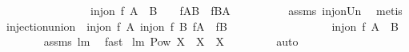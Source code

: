 \begin{isabellebody}
\ \ \ \ \ \ \ \ \ \ \ \ \ \ \ \ {\isachardoublequoteopen}inj{\isacharunderscore}on\ f\ {\isacharparenleft}A\ {\isasymunion}\ B{\isacharparenright}\ \ {\isacharequal}\ \ {\isacharparenleft}f{\isacharbackquote}{\isacharparenleft}A{\isacharminus}B{\isacharparenright}\ {\isasyminter}\ {\isacharparenleft}f{\isacharbackquote}{\isacharparenleft}B{\isacharminus}A{\isacharparenright}{\isacharparenright}\ {\isacharequal}\ {\isacharbraceleft}{\isacharbraceright}{\isacharparenright}{\isachardoublequoteclose}\isanewline
%
\isadelimproof
\ \ \ \ \ \ %
\endisadelimproof
%
\isatagproof
{}\isamarkupfalse%
\ assms\ inj{\isacharunderscore}on{\isacharunderscore}Un\ \isamarkupfalse%
\ {\isacharparenleft}metis{\isacharparenright}%
\endisatagproof
{\isafoldproof}%
%
\isadelimproof
\isanewline
%
\endisadelimproof
\isanewline
{}\isamarkupfalse%
\ injection{\isacharunderscore}union{\isacharcolon}\ \ {\isachardoublequoteopen}inj{\isacharunderscore}on\ f\ A{\isachardoublequoteclose}\ {\isachardoublequoteopen}inj{\isacharunderscore}on\ f\ B{\isachardoublequoteclose}\ {\isachardoublequoteopen}{\isacharparenleft}f{\isacharbackquote}A{\isacharparenright}\ {\isasyminter}\ {\isacharparenleft}f{\isacharbackquote}B{\isacharparenright}\ {\isacharequal}\ {\isacharbraceleft}{\isacharbraceright}{\isachardoublequoteclose}\ \isanewline
\ \ \ \ \ \ \ \ \ \ \ \ \ \ \ {\isachardoublequoteopen}inj{\isacharunderscore}on\ f\ {\isacharparenleft}A\ {\isasymunion}\ B{\isacharparenright}{\isachardoublequoteclose}\ \isanewline
%
\isadelimproof
\ \ \ \ \ \ %
\endisadelimproof
%
\isatagproof
{}\isamarkupfalse%
\ assms\ lm{}{}\ \isamarkupfalse%
\ fast%
\endisatagproof
{\isafoldproof}%
%
\isadelimproof
\isanewline
%
\endisadelimproof
\isanewline
{}\isamarkupfalse%
\ lm{}{}{\isacharcolon}\ {\isachardoublequoteopen}{\isacharparenleft}Pow\ X\ {\isacharequal}\ {\isacharbraceleft}X{\isacharbraceright}{\isacharparenright}\ {\isacharequal}\ {\isacharparenleft}X{\isacharequal}{\isacharbraceleft}{\isacharbraceright}{\isacharparenright}{\isachardoublequoteclose}\ \isanewline
%
\isadelimproof
\ \ \ \ \ \ %
\endisadelimproof
%
\isatagproof
{}\isamarkupfalse%
\ auto%
\endisatagproof
{\isafoldproof}%
%
\isadelimproof
\isanewline
%
\endisadelimproof
%
\isadelimtheory
\isanewline
%
\endisadelimtheory
%
\isatagtheory
{}\isamarkupfalse%
%
\endisatagtheory
{\isafoldtheory}%
%
\isadelimtheory
%
\endisadelimtheory
\end{isabellebody}%
